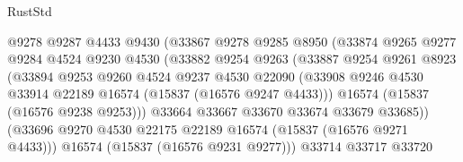 \begin{lexlean}{RustStd}
\begin{coremodule}
                                @9278
                                @9287
                                @4433
                                @9430
                                (@33867
                                  @9278
                                  @9285
                                  @8950
                                  (@33874
                                    @9265
                                    @9277
                                    @9284
                                    @4524
                                    @9230
                                    @4530
                                    (@33882
                                      @9254
                                      @9263
                                      (@33887
                                        @9254
                                        @9261
                                        @8923
                                        (@33894
                                          @9253
                                          @9260
                                          @4524
                                          @9237
                                          @4530
                                          @22090
                                          (@33908
                                            @9246
                                            @4530
                                            @33914
                                            @22189
                                            @16574
                                            (@15837 (@16576 @9247 @4433)))
                                          @16574
                                          (@15837 (@16576 @9238 @9253)))
                                        @33664
                                        @33667
                                        @33670
                                        @33674
                                        @33679
                                        @33685))
                                    (@33696
                                      @9270
                                      @4530
                                      @22175
                                      @22189
                                      @16574
                                      (@15837 (@16576 @9271 @4433)))
                                    @16574
                                    (@15837 (@16576 @9231 @9277)))
                                  @33714
                                  @33717
                                  @33720

\end{coremodule}
\end{lexlean}
